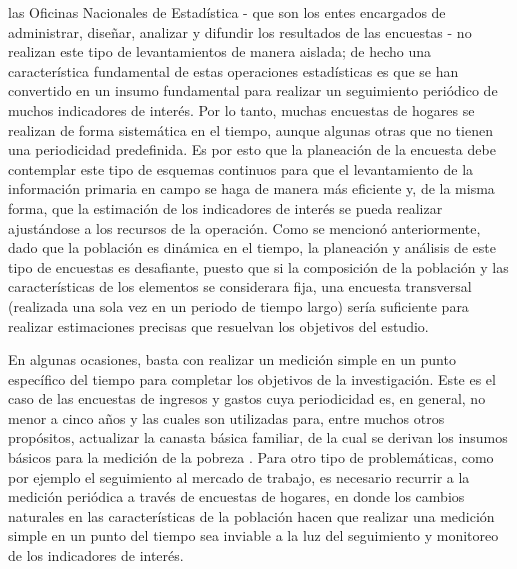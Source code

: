 \documentclass[
  10pt,
  spanish,
]{book}
\begin{document}
las Oficinas Nacionales de Estadística - que son los entes encargados de administrar, diseñar, analizar y difundir los resultados de las encuestas - no realizan este tipo de levantamientos de manera aislada; de hecho una característica fundamental de estas operaciones estadísticas es que se han convertido en un insumo fundamental para realizar un seguimiento periódico de muchos indicadores de interés. Por lo tanto, muchas encuestas de hogares se realizan de forma sistemática en el tiempo, aunque algunas otras que no tienen una periodicidad predefinida. Es por esto que la planeación de la encuesta debe contemplar este tipo de esquemas continuos para que el levantamiento de la información primaria en campo se haga de manera más eficiente y, de la misma forma, que la estimación de los indicadores de interés se pueda realizar ajustándose a los recursos de la operación. Como se mencionó anteriormente, dado que la población es dinámica en el tiempo, la planeación y análisis de este tipo de encuestas es desafiante, puesto que si la composición de la población y las características de los elementos se considerara fija, una encuesta transversal (realizada una sola vez en un periodo de tiempo largo) sería suficiente para realizar estimaciones precisas que resuelvan los objetivos del estudio.

En algunas ocasiones, basta con realizar un medición simple en un punto específico del tiempo para completar los objetivos de la investigación. Este es el caso de las encuestas de ingresos y gastos cuya periodicidad es, en general, no menor a cinco años y las cuales son utilizadas para, entre muchos otros propósitos, actualizar la canasta básica familiar, de la cual se derivan los insumos básicos para la medición de la pobreza \citep{CEPAL_2018}. Para otro tipo de problemáticas, como por ejemplo el seguimiento al mercado de trabajo, es necesario recurrir a la medición periódica a través de encuestas de hogares, en donde los cambios naturales en las características de la población hacen que realizar una medición simple en un punto del tiempo sea inviable a la luz del seguimiento y monitoreo de los indicadores de interés.
\end{document}
